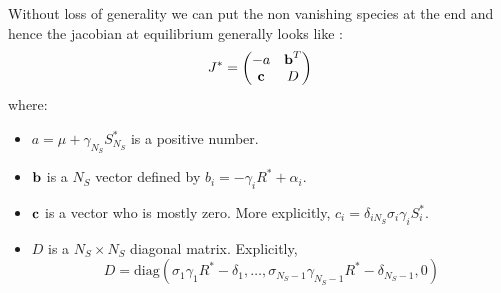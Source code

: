 \documentclass[12pt, titlepage]{report}
\begin{document}
	Without loss of generality we can put the non vanishing species at the end and hence the jacobian at equilibrium generally looks like :
	\begin{equation}
		J^* =
		\begin{pmatrix}
			-a & \textbf{b}^T \\
			\textbf{c} & D
		\end{pmatrix}
	\end{equation}
	where:
	\begin{itemize}
		\item $a = \mu+\gamma_{N_S} S^*_{N_S}$ is a positive number.
		\item $\textbf{b}$ is a $N_S$ vector defined by $b_i = - \gamma_i R^* + \alpha_i$.
		\item $\textbf{c}$ is a vector who is mostly zero. More explicitly, $c_i = \delta_{iN_S} \sigma_i \gamma_i S^*_i$.
		\item $D$ is a $N_S \times N_S$ diagonal matrix. Explicitly,
		$$D = \text{diag}(\sigma_1 \gamma_1 R^*-\delta_1, \dots,\sigma_{N_S-1} \gamma_{N_S-1} R^*-\delta_{N_S-1}, 0)$$
	\end{itemize}
\end{document}
